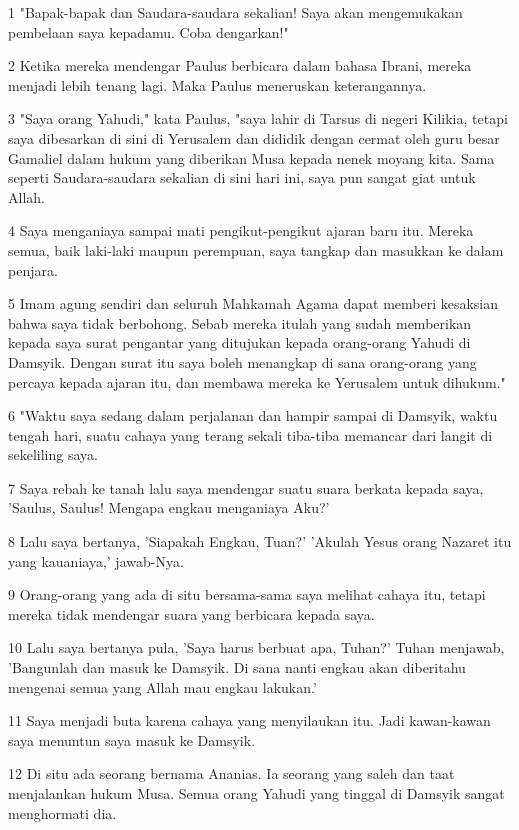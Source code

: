 \par 1 "Bapak-bapak dan Saudara-saudara sekalian! Saya akan mengemukakan pembelaan saya kepadamu. Coba dengarkan!"
\par 2 Ketika mereka mendengar Paulus berbicara dalam bahasa Ibrani, mereka menjadi lebih tenang lagi. Maka Paulus meneruskan keterangannya.
\par 3 "Saya orang Yahudi," kata Paulus, "saya lahir di Tarsus di negeri Kilikia, tetapi saya dibesarkan di sini di Yerusalem dan dididik dengan cermat oleh guru besar Gamaliel dalam hukum yang diberikan Musa kepada nenek moyang kita. Sama seperti Saudara-saudara sekalian di sini hari ini, saya pun sangat giat untuk Allah.
\par 4 Saya menganiaya sampai mati pengikut-pengikut ajaran baru itu. Mereka semua, baik laki-laki maupun perempuan, saya tangkap dan masukkan ke dalam penjara.
\par 5 Imam agung sendiri dan seluruh Mahkamah Agama dapat memberi kesaksian bahwa saya tidak berbohong. Sebab mereka itulah yang sudah memberikan kepada saya surat pengantar yang ditujukan kepada orang-orang Yahudi di Damsyik. Dengan surat itu saya boleh menangkap di sana orang-orang yang percaya kepada ajaran itu, dan membawa mereka ke Yerusalem untuk dihukum."
\par 6 "Waktu saya sedang dalam perjalanan dan hampir sampai di Damsyik, waktu tengah hari, suatu cahaya yang terang sekali tiba-tiba memancar dari langit di sekeliling saya.
\par 7 Saya rebah ke tanah lalu saya mendengar suatu suara berkata kepada saya, 'Saulus, Saulus! Mengapa engkau menganiaya Aku?'
\par 8 Lalu saya bertanya, 'Siapakah Engkau, Tuan?' 'Akulah Yesus orang Nazaret itu yang kauaniaya,' jawab-Nya.
\par 9 Orang-orang yang ada di situ bersama-sama saya melihat cahaya itu, tetapi mereka tidak mendengar suara yang berbicara kepada saya.
\par 10 Lalu saya bertanya pula, 'Saya harus berbuat apa, Tuhan?' Tuhan menjawab, 'Bangunlah dan masuk ke Damsyik. Di sana nanti engkau akan diberitahu mengenai semua yang Allah mau engkau lakukan.'
\par 11 Saya menjadi buta karena cahaya yang menyilaukan itu. Jadi kawan-kawan saya menuntun saya masuk ke Damsyik.
\par 12 Di situ ada seorang bernama Ananias. Ia seorang yang saleh dan taat menjalankan hukum Musa. Semua orang Yahudi yang tinggal di Damsyik sangat menghormati dia.
